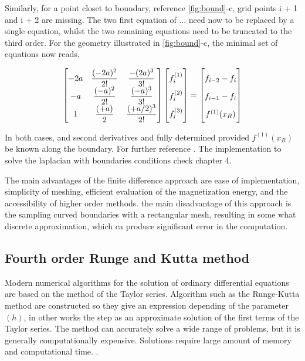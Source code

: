 Similarly, for a point closet to boundary, reference \ref{fig:bound}-c, grid points i + 1 and i + 2 are missing. The two first equation of ... need now to be replaced by a single equation, whilst the two remaining equations need to be truncated to the third order. For the geometry illustrated in \ref{fig:bound}-c, the minimal set of equations now reads.

\begin{align} \label{eq:matrix3}
\begin{bmatrix}
    -2a & \dfrac{(-2a)^2}{2!} & \dfrac{-(2a)^3}{3!}\\
    -a & \dfrac{(-a)^2}{2!} & \dfrac{(-a)^3}{3!}\\
    1 & \dfrac{(+a)}{2} & \dfrac{(+a/2)^3}{2!}
\end{bmatrix}
\begin{bmatrix}
    f_i^{(1)}  \vphantom{ \dfrac{d^4}{d} }\\
    f_i^{(2)}  \vphantom{ \dfrac{d^4}{d} } \\
    f_i^{(3)}  \vphantom{ \dfrac{d^4}{d} }
\end{bmatrix}
=
\begin{bmatrix}
    f_{i-2} - f_{i}    \vphantom{ \dfrac{d^4}{d}} \\
    f_{i-1} - f_{i}    \vphantom{ \dfrac{d^4}{d}} \\
    f^{(1)}(x_R)   \vphantom{ \dfrac{d^4}{d}}
\end{bmatrix}
\end{align}

In both cases, and second derivatives and fully determined provided $f^{(1)}(x_R)$ be known along the boundary. For further reference \cite{methods}. The implementation to solve the laplacian with boundaries conditions check chapter 4.

The main advantages of the finite difference approach are ease of implementation, simplicity of meshing, efficient evaluation of the magnetization energy, and the accessibility of higher order methods. the main disadvantage of this approach is the sampling curved boundaries with a rectangular mesh, resulting in some what discrete  approximation, which ca produce significant error in the computation.

\subsection{Fourth order Runge and Kutta method}

 Modern numerical algorithms for the solution of ordinary differential equations are based on the method of the Taylor series. Algorithm such as the Runge-Kutta method are constructed so they give an expression depending of the parameter $(h)$, in other works the step as an approximate solution of the first terms of the Taylor series. The method can accurately solve a wide range of problems, but it is generally computationally expensive. Solutions require large amount of memory and computational time. \cite{numerical}.

